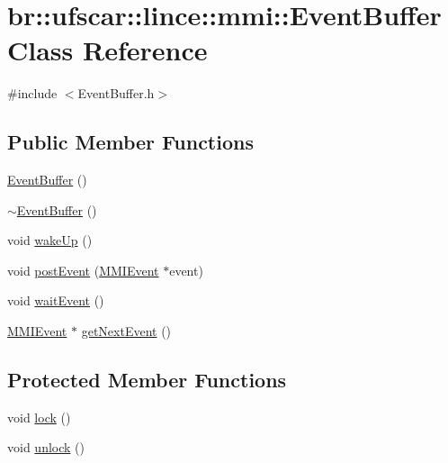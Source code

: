 \hypertarget{classbr_1_1ufscar_1_1lince_1_1mmi_1_1EventBuffer}{
\section{br::ufscar::lince::mmi::EventBuffer Class Reference}
\label{classbr_1_1ufscar_1_1lince_1_1mmi_1_1EventBuffer}
}


{\ttfamily \#include $<$EventBuffer.h$>$}

\subsection*{Public Member Functions}
\begin{DoxyCompactItemize}
\item 
\hyperlink{classbr_1_1ufscar_1_1lince_1_1mmi_1_1EventBuffer_ad56636c9a70bd3ee6c81d8a15dfb7c82}{EventBuffer} ()
\item 
\hyperlink{classbr_1_1ufscar_1_1lince_1_1mmi_1_1EventBuffer_a9d3d15129e46525a9399216b9b6d02eb}{$\sim$EventBuffer} ()
\item 
void \hyperlink{classbr_1_1ufscar_1_1lince_1_1mmi_1_1EventBuffer_a82e03358c8b7323ba743feb2b242d327}{wakeUp} ()
\item 
void \hyperlink{classbr_1_1ufscar_1_1lince_1_1mmi_1_1EventBuffer_a082c7953dc3c98ce8304ce27e8c7a8fc}{postEvent} (\hyperlink{classbr_1_1ufscar_1_1lince_1_1mmi_1_1MMIEvent}{MMIEvent} $\ast$event)
\item 
void \hyperlink{classbr_1_1ufscar_1_1lince_1_1mmi_1_1EventBuffer_afea99cb30dcb0a6cdbca2c7902a2fa55}{waitEvent} ()
\item 
\hyperlink{classbr_1_1ufscar_1_1lince_1_1mmi_1_1MMIEvent}{MMIEvent} $\ast$ \hyperlink{classbr_1_1ufscar_1_1lince_1_1mmi_1_1EventBuffer_a9e497a0f2baf03f32c0df8222a4e5f90}{getNextEvent} ()
\end{DoxyCompactItemize}
\subsection*{Protected Member Functions}
\begin{DoxyCompactItemize}
\item 
void \hyperlink{classbr_1_1ufscar_1_1lince_1_1mmi_1_1EventBuffer_af7ee2f11f7e65ab0394040f579132596}{lock} ()
\item 
void \hyperlink{classbr_1_1ufscar_1_1lince_1_1mmi_1_1EventBuffer_a3b3a81b43ed99f201d6b70246dc83587}{unlock} ()
\end{DoxyCompactItemize}


